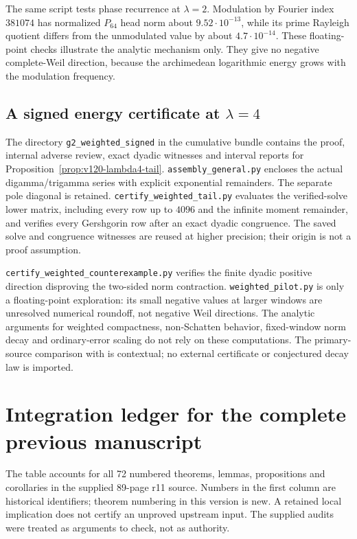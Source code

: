 \documentclass[11pt]{article}
\theoremstyle{remark}
\begin{document}
The same script tests phase recurrence at $\lambda=2$. Modulation by
Fourier index $381074$ has normalized $P_{64}$ head norm about
$9.52\cdot10^{-13}$, while its prime Rayleigh quotient differs from
the unmodulated value by about $4.7\cdot10^{-14}$.
These floating-point checks illustrate the analytic mechanism only.
They give no negative complete-Weil direction, because the
archimedean logarithmic energy grows with the modulation frequency.

\subsection*{A signed energy certificate at $\lambda=4$}
The directory \texttt{g2\_weighted\_signed} in the cumulative bundle
contains the proof, internal adverse review, exact dyadic witnesses
and interval reports for Proposition~\ref{prop:v120-lambda4-tail}.
\texttt{assembly\_general.py} encloses the actual digamma/trigamma
series with explicit exponential remainders. The separate pole diagonal
is retained. \texttt{certify\_weighted\_tail.py} evaluates the
verified-solve lower matrix, including every row up to $4096$ and the
infinite moment remainder, and verifies every Gershgorin row after an
exact dyadic congruence. The saved solve and congruence witnesses are
reused at higher precision; their origin is not a proof assumption.

\texttt{certify\_weighted\_counterexample.py} verifies the finite
dyadic positive direction disproving the two-sided norm contraction.
\texttt{weighted\_pilot.py} is only a floating-point exploration:
its small negative values at larger windows are unresolved numerical
roundoff, not negative Weil directions. The analytic arguments for
weighted compactness, non-Schatten behavior, fixed-window norm decay
and ordinary-error scaling do not rely on these computations.
The primary-source comparison with \cite{Zhu2026Windows} is contextual;
no external certificate or conjectured decay law is imported.

\section{Integration ledger for the complete previous manuscript}\label{app:ledger}
The table accounts for all 72 numbered theorems, lemmas, propositions and
corollaries in the supplied 89-page r11 source. Numbers in the first column
are historical identifiers; theorem numbering in this version is new.
A retained local implication does not certify an unproved upstream input.
The supplied audits were treated as arguments to check, not as authority.
\end{document}
